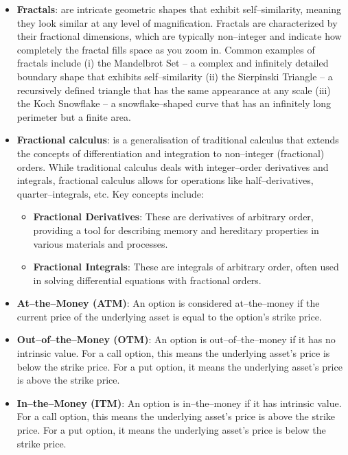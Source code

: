\documentclass[12pt,a4paper]{report}
\numberwithin{equation}{section}
\begin{document}
\begin{itemize}
\item \textbf{Fractals}: are intricate geometric shapes that exhibit
self--similarity, meaning they look similar at any level of
magnification. Fractals are characterized by their fractional
dimensions, which are typically non--integer and indicate how completely
the fractal fills space as you zoom in. Common examples of fractals
include (i) the Mandelbrot Set -- a complex and infinitely detailed
boundary shape that exhibits self--similarity (ii) the Sierpinski
Triangle -- a recursively defined triangle that has the same appearance
at any scale (iii) the Koch Snowflake -- a snowflake--shaped curve that
has an infinitely long perimeter but a finite area.

\item \textbf{Fractional calculus}: is a generalisation of traditional calculus
that extends the concepts of differentiation and integration to
non--integer (fractional) orders. While traditional calculus deals with
integer--order derivatives and integrals, fractional calculus allows for
operations like half--derivatives, quarter--integrals, etc. Key concepts
include:
  \begin{itemize}
  \item \textbf{Fractional Derivatives}: These are derivatives of arbitrary order,
  providing a tool for describing memory and hereditary properties in
  various materials and processes.
  \item \textbf{Fractional Integrals}: These are integrals of arbitrary order, often
  used in solving differential equations with fractional orders.
  \end{itemize}

\item \textbf{At--the--Money (ATM)}: An option is considered at--the--money if the
current price of the underlying asset is equal to the option's strike
price.

\item \textbf{Out--of--the--Money (OTM)}: An option is out--of--the--money if it has no
intrinsic value. For a call option, this means the underlying asset's
price is below the strike price. For a put option, it means the
underlying asset's price is above the strike price.

\item \textbf{In--the--Money (ITM)}: An option is in--the--money if it has intrinsic
value. For a call option, this means the underlying asset's price is
above the strike price. For a put option, it means the underlying
asset's price is below the strike price.


\end{itemize}
\end{document}
